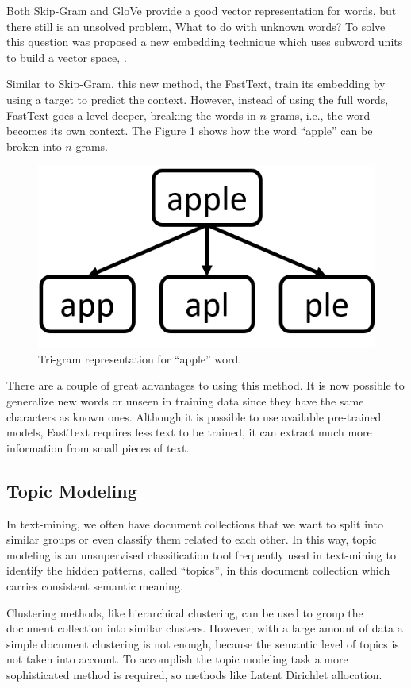 	Both Skip-Gram and GloVe provide a good vector representation for words, but there still is an unsolved problem, What to do with unknown words? To solve this question was proposed a new embedding technique which uses subword units to build a vector space, \cite{bojanowski2017enriching}.

	Similar to Skip-Gram, this new method, the FastText, train its embedding by using a target to predict the context. However, instead of using the full words, FastText goes a level deeper, breaking the words in $n$-grams, i.e., the word becomes its own context. The Figure \ref{fig:apple-tri-gram} shows how the word ``apple'' can be broken into $n$-grams.

	\begin{figure}[h!]
		\centering
		\includegraphics[width=0.4\linewidth]{01.Chapters/02.Background/apple-tri-gram}
		\caption{Tri-gram representation for ``apple'' word.}
		\label{fig:apple-tri-gram}
	\end{figure}

	There are a couple of great advantages to using this method. It is now possible to generalize new words or unseen in training data since they have the same characters as known ones. Although it is possible to use available pre-trained models, FastText requires less text to be trained, it can extract much more information from small pieces of text.

	\subsection{Topic Modeling}

	In text-mining, we often have document collections that we want to split into similar groups or even classify them related to each other. In this way, topic modeling is an unsupervised classification tool frequently used in text-mining to identify the hidden patterns, called ``topics'', in this document collection which carries consistent semantic meaning.

	Clustering methods, like hierarchical clustering, can be used to group the document collection into similar clusters. However, with a large amount of data a simple document clustering is not enough, because the semantic level of topics is not taken into account. To accomplish the topic modeling task a more sophisticated method is required, so methods like Latent Dirichlet allocation.

